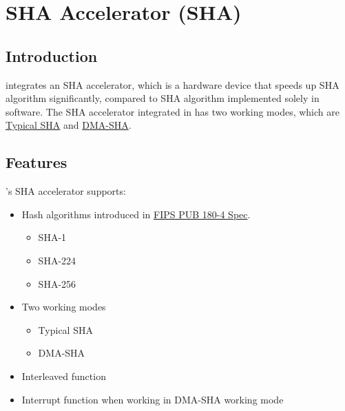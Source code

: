 \documentclass[main\_\_EN.tex]{subfiles}
\begin{document}

\ifglobal
\else
    {\let\clearpage\relax \listoftodos}
    {\let\clearpage\relax \listofdonetodos}
    \tableofcontents
\fi



\hypertarget{sha}{}
\chapter{SHA Accelerator (SHA)}
\label{mod:sha}
\section{Introduction}

\chipname{} integrates an SHA accelerator, which is a hardware device that speeds up SHA algorithm significantly, compared to SHA algorithm implemented solely in software. The SHA accelerator integrated in \chipname{} has two working modes, which are  \hyperref[sec:sha-typical-sha]{Typical SHA} and  \hyperref[sec:sha-dma-sha]{DMA-SHA}.

\section{Features}

\chipname{} 's SHA accelerator supports:

\begin{itemize}
    \item Hash algorithms introduced in   \href{https://doi.org/10.6028/NIST.FIPS.180-4}{FIPS PUB 180-4 Spec}.
    \begin{itemize}
        \item SHA-1
        \item SHA-224
        \item SHA-256
    \end{itemize}
    \item Two working modes
    \begin{itemize}
        \item Typical SHA 
        \item DMA-SHA  
    \end{itemize}
    \item Interleaved function
    \item Interrupt function when working in DMA-SHA working mode
\end{itemize}
\end{document}
